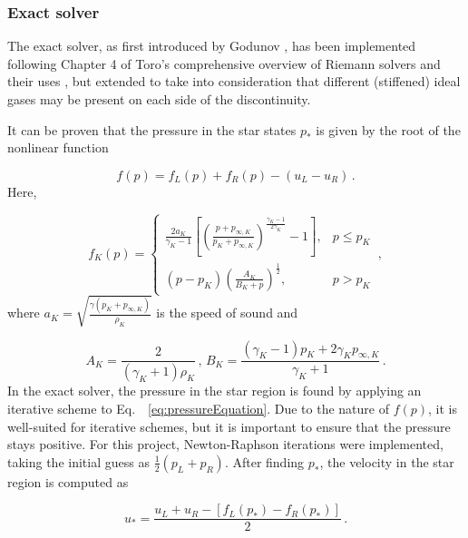 \documentclass[final,3p,twocolumn,times]{elsarticle}
\begin{document}
\subsubsection{Exact solver}
\label{subsubsec:exact}

The exact solver, as first introduced by Godunov \cite{godunov1959difference},
has been implemented following Chapter 4 of Toro's comprehensive overview of
Riemann solvers and their uses \cite{toro2013riemann}, but extended to take
into consideration that different (stiffened) ideal gases may be present on
each side of the discontinuity. 

It can be proven that the pressure in the star states $p_{*}$ is given by
the root of the nonlinear function

\begin{equation}
    f(p) = f_L(p)+f_R(p)- (u_L-u_R) \,.
    \label{eq:pressureEquation}
\end{equation}
%
Here,  

\begin{equation*}
    f_K(p) = 
    \begin{cases}
        \frac{2a_K}{\gamma_K-1} \left[ \left(
            \frac{p+p_{\infty,K}}{p_K+p_{\infty,K}}
        \right)^{\frac{\gamma_K-1}{2\gamma_K}}-1\right], &p\leq p_K \\
        (p-p_K)\left( \frac{A_K}{B_K+p} \right)^{\frac{1}{2}}, &p>p_K
    \end{cases} \,,
\end{equation*}
%
where $a_K = \sqrt{\frac{\gamma(p_K+p_{\infty,K})}{\rho_K}}$ is the speed of
sound and 

\begin{equation*}
    A_K = \frac{2}{(\gamma_K+1)\rho_K} \,,\,
    B_K = \frac{(\gamma_K-1)p_K+2\gamma_K p_{\infty, K}}{\gamma_K+1} \,.
\end{equation*}
% 
In the exact solver, the pressure in the star region is found by applying an
iterative scheme to Eq.~ \eqref{eq:pressureEquation}. Due to the nature of
$f(p)$, it is well-suited for iterative schemes, but
it is important to ensure that the pressure stays positive. For this project,
Newton-Raphson iterations were implemented, taking the initial guess as
$\frac{1}{2}(p_L+p_R)$. After finding $p_*$, the velocity in the star region is computed as

\begin{equation}
    u_{*} = \frac{u_L+u_R-[f_L(p_*)-f_R(p_*)]}{2} \,.
    \label{eq:ustar}
\end{equation}
\end{document}
